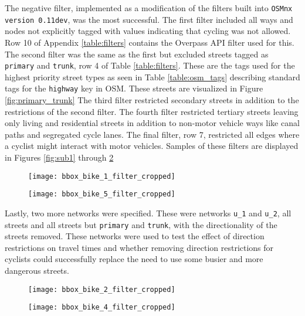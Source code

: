 The negative filter, implemented as a modification of the filters built into \texttt{OSMnx version 0.11dev}, was the most successful. The first filter included all ways and nodes not explicitly tagged with values indicating that cycling was not allowed. Row 10 of Appendix \ref{table:filters} contains the Overpass API filter used for this. The second filter was the same as the first but excluded streets tagged as \texttt{primary} and \texttt{trunk}, row 4 of  Table \ref{table:filters}. These are the tags used for the highest priority street types as seen in Table \ref{table:osm_tags} describing standard tags for the \texttt{highway} key in OSM. These streets are visualized in Figure \ref{fig:primary_trunk} The third filter restricted secondary streets in addition to the restrictions of the second filter. The fourth filter restricted tertiary streets leaving only living and residential streets in addition to non-motor vehicle ways like canal paths and segregated cycle lanes. The final filter, row 7, restricted all edges where a cyclist might interact with motor vehicles. Samples of these filters are displayed in Figures \ref{fig:sub1} through \ref{fig:sub4}

\begin{figure}
\centering
\begin{minipage}{.5\textwidth}
  \centering
  \texttt{[image: bbox\_bike\_1\_filter\_cropped]}
  \label{fig:sub1}
\end{minipage}%
\begin{minipage}{.5\textwidth}
  \centering
  \texttt{[image: bbox\_bike\_5\_filter\_cropped]}
  \label{fig:sub2}
\end{minipage}
\end{figure}


Lastly, two more networks were specified. These were networks \texttt{u\_1} and \texttt{u\_2}, all streets and all streets but \texttt{primary} and \texttt{trunk}, with the directionality of the streets removed. These networks were used to test the effect of direction restrictions on travel times and whether removing direction restrictions for cyclists could successfully replace the need to use some busier and more dangerous streets. 

\begin{figure}
\centering
\begin{minipage}{.5\textwidth}
  \centering
  \texttt{[image: bbox\_bike\_2\_filter\_cropped]}
  \label{fig:sub3}
\end{minipage}%
\begin{minipage}{.5\textwidth}
  \centering
  \texttt{[image: bbox\_bike\_4\_filter\_cropped]}
  \label{fig:sub4}
\end{minipage}
\end{figure}



